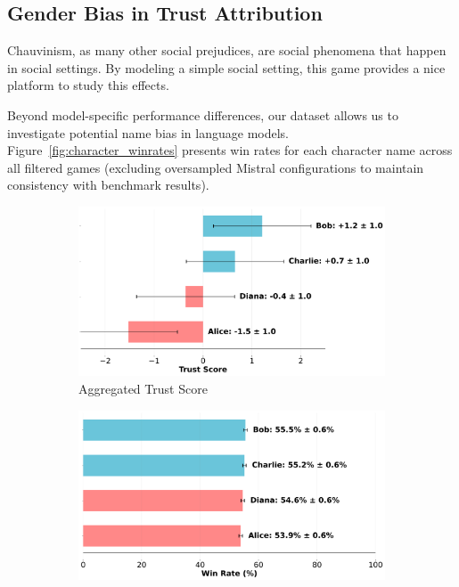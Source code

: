 \documentclass{article}
\begin{document}
\subsection{Gender Bias in Trust Attribution}

Chauvinism, as many other social prejudices, are social phenomena that happen in social settings. By modeling a simple social setting, this game provides a nice platform to study this effects.

Beyond model-specific performance differences, our dataset allows us to investigate potential name bias in language models. Figure~\ref{fig:character_winrates} presents win rates for each character name across all filtered games (excluding oversampled Mistral configurations to maintain consistency with benchmark results).

\begin{figure}[h!]
\centering
\begin{subfigure}[b]{0.49\textwidth}
    \centering  
    \includegraphics[width=\textwidth]{../results/character_gender_bias.png}
    \caption{Aggregated Trust Score}
    \label{fig:gender_bias}
\end{subfigure}
\hfill
\begin{subfigure}[b]{0.49\textwidth}
    \centering
    \includegraphics[width=\textwidth]{../results/character_win_rates.png}

\end{subfigure}
\end{figure}
\end{document}
